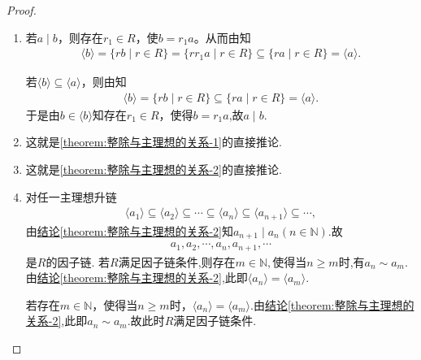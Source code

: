 \documentclass[../../main.tex]{subfiles}%
\begin{document}
\begin{proof}
\begin{enumerate}[(1)]
\item 若$a \mid b$，则存在$r_1 \in R$，使$b = r_1a$。从而由知
\begin{align*}
\langle b \rangle = \{ rb \mid r \in R \} = \{ rr_1a \mid r \in R \} \subseteq \{ ra \mid r \in R \} = \langle a \rangle.
\end{align*}

若$\langle b \rangle \subseteq \langle a \rangle$，则由知
\begin{align*}
\langle b \rangle = \{ rb \mid r \in R \} \subseteq \{ ra \mid r \in R \} = \langle a \rangle.
\end{align*}
于是由$b \in \langle b \rangle$知存在$r_1 \in R$，使得$b = r_1a$,故$a \mid b$.

\item 这就是\ref{theorem:整除与主理想的关系-1}的直接推论.

\item 这就是\ref{theorem:整除与主理想的关系-2}的直接推论.

\item 对任一主理想升链
\begin{align*}
\langle a_1 \rangle \subseteq \langle a_2 \rangle \subseteq \cdots \subseteq \langle a_n \rangle \subseteq \langle a_{n+1} \rangle \subseteq \cdots,
\end{align*}
由\hyperref[theorem:整除与主理想的关系-2]{结论\ref{theorem:整除与主理想的关系-2}}知$a_{n+1}\mid a_n(n\in \mathbb{N})$.故
\begin{align*}
a_1,a_2,\cdots ,a_n,a_{n+1},\cdots 
\end{align*}
是$R$的因子链.
若$R$满足因子链条件,则存在$m\in \mathbb{N},$使得当$n\geqslant m$时,有$a_n\sim a_m$.由\hyperref[theorem:整除与主理想的关系-2]{结论\ref{theorem:整除与主理想的关系-2}},此即$\langle a_n \rangle = \langle a_m \rangle$.

若存在$m\in \mathbb{N}$，使得当$n \geqslant m$时，$\langle a_n \rangle = \langle a_m \rangle$.由\hyperref[theorem:整除与主理想的关系-2]{结论\ref{theorem:整除与主理想的关系-2}},此即$a_n\sim a_m$.故此时$R$满足因子链条件.

\end{enumerate}

\end{proof}
\end{document}
